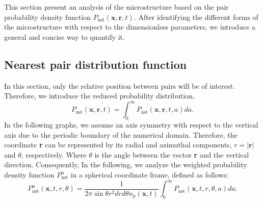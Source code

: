 This section present an analysis of the microstructure based on the pair probability density function  $P_\text{nst}(\textbf{x},\textbf{r},t)$.
After identifying the different forms of the microstructure with respect to the dimensionless parameters, we introduce a general and concise way to quantify it.

\subsection{Nearest pair distribution function}
In this section, only the relative position between pairs will be of interest. 
Therefore, we introduce the reduced probability distribution,
\begin{equation*}
    P_\text{nst}(\textbf{x},\textbf{r},t)
    = \int_0^\infty P_\text{nst}(\textbf{x},\textbf{r},t,a) da.
\end{equation*}
In the following graphs, we assume an axis symmetry with respect to the vertical axis due to the periodic boundary of the numerical domain.
Therefore, the coordinate \textbf{r} can be represented by its radial and azimuthal components, $r = |\textbf{r}|$ and $\theta$, respectively.
Where $\theta$ is the angle between the vector \textbf{r} and the vertical direction.
Consequently, In the following, we analyze the weighted probability density function $P_\text{nst}^n$ in a spherical coordinate frame, defined as follows:
\begin{equation*}
    P_\text{nst}^n(\textbf{x},t,r,\theta)
    =\frac{1}{2\pi \sin\theta r^2 dr d\theta n_p(\textbf{x},t) }\int_0^\infty P_\text{nst}(\textbf{x},t,r,\theta,a) da.
\end{equation*}


